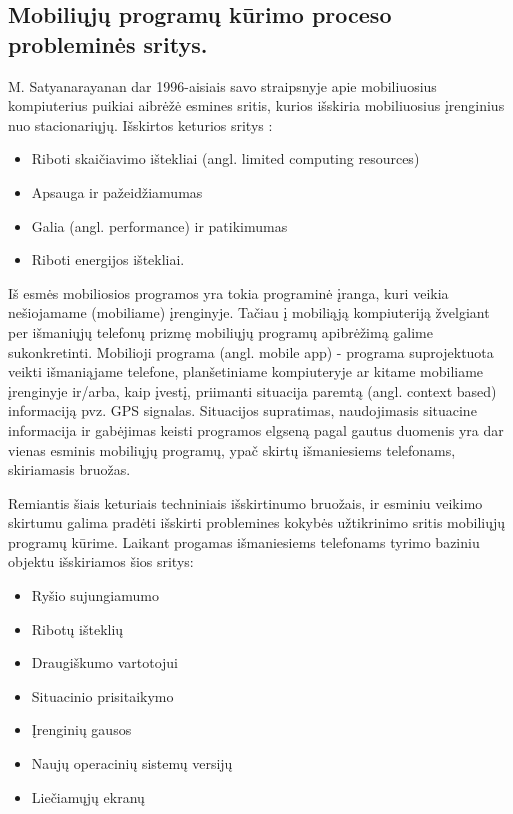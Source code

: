 \documentclass{VUMIFPSkursinis}
\begin{document}
\subsection{Mobiliųjų programų kūrimo proceso probleminės sritys.}
M. Satyanarayanan dar 1996-aisiais savo straipsnyje apie mobiliuosius kompiuterius puikiai aibrėžė esmines sritis, kurios išskiria mobiliuosius įrenginius nuo stacionariųjų. Išskirtos keturios sritys \cite{Satyanarayanan:1996:FCM:248052.248053}:
\begin{itemize}
   \item Riboti skaičiavimo ištekliai (angl. limited computing resources)
   \item Apsauga ir pažeidžiamumas
   \item Galia (angl. performance) ir patikimumas
   \item Riboti energijos ištekliai.
\end{itemize}

Iš esmės mobiliosios programos yra tokia programinė įranga, kuri veikia nešiojamame (mobiliame) įrenginyje. Tačiau į mobiliąją kompiuteriją žvelgiant per išmaniųjų telefonų prizmę mobiliųjų programų apibrėžimą galime sukonkretinti. Mobilioji programa (angl. mobile app) - programa suprojektuota veikti išmaniąjame telefone, planšetiniame kompiuteryje ar kitame mobiliame įrenginyje ir/arba, kaip įvestį, priimanti situacija paremtą (angl. context based) informaciją pvz. GPS signalas. \cite{6496451} Situacijos supratimas, naudojimasis situacine informacija ir gabėjimas keisti programos elgseną pagal gautus duomenis yra dar vienas esminis mobiliųjų programų, ypač skirtų išmaniesiems telefonams, skiriamasis bruožas.

Remiantis šiais keturiais techniniais išskirtinumo bruožais, ir esminiu veikimo skirtumu galima pradėti išskirti problemines kokybės užtikrinimo sritis mobiliųjų programų kūrime. Laikant progamas išmaniesiems telefonams tyrimo baziniu objektu išskiriamos šios sritys:
\begin{itemize}
  \item  Ryšio sujungiamumo
  \item Ribotų išteklių
  \item Draugiškumo vartotojui
  \item Situacinio prisitaikymo
  \item Įrenginių gausos
  \item Naujų operacinių sistemų versijų
  \item Liečiamųjų ekranų
\end{itemize}
\end{document}
